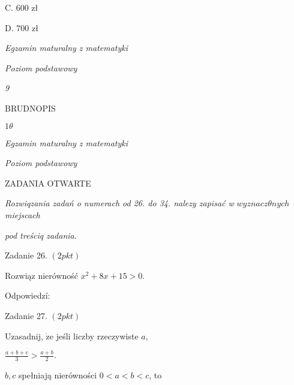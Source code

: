 \documentclass[a4paper,12pt]{article}
\begin{document}
C. 600 zł

D. 700 zł





{\it Egzamin maturalny z matematyki}

{\it Poziom podstawowy}

{\it 9}

BRUDNOPIS





$ 1\theta$

{\it Egzamin maturalny z matematyki}

{\it Poziom podstawowy}

ZADANIA OTWARTE

{\it Rozwiqzania zadań o numerach od 26. do 34. nalezy zapisać w} $wyznacz\theta nych$ {\it miejscach}

{\it pod treściq zadania}.

Zadanie 26. $(2pkt)$

Rozwiąz nierówność $x^{2}+8x+15>0.$

Odpowiedzí:

Zadanie 27. $(2pkt)$

Uzasadnij, $\dot{\mathrm{z}}\mathrm{e}$ jeśli liczby rzeczywiste $a,$

$\displaystyle \frac{a+b+c}{3}>\frac{a+b}{2}.$

$b, c$ spełniają nierówności $0<a<b<c$, to
\end{document}

